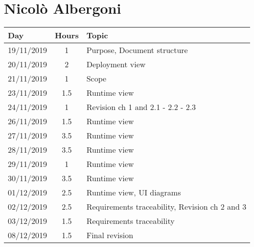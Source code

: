 \section{Nicolò Albergoni}
\begin{table}[H]
  \centering
  \begin{tabularx}{\textwidth}{ |l|c|X| }
      \hline
      Day & Hours & Topic \\
      \hline
      19/11/2019 & 1 & Purpose, Document structure \\								
      \hline
      20/11/2019 & 2 & Deployment view \\
      \hline
      21/11/2019 & 1 & Scope \\
      \hline								
      23/11/2019 & 1.5 &  Runtime view \\									
      \hline
      24/11/2019 & 1 & Revision ch 1 and 2.1 - 2.2 - 2.3 \\									
      \hline
      26/11/2019 & 1.5 & Runtime view \\									
      \hline
      27/11/2019 & 3.5 & Runtime view \\									
      \hline
      28/11/2019 & 3.5 & Runtime view \\
      \hline
      29/11/2019 & 1 & Runtime view \\									
      \hline
      30/11/2019 & 3.5 & Runtime view \\									
      \hline
      01/12/2019 & 2.5 & Runtime view, UI diagrams \\									
      \hline
      02/12/2019 & 2.5 & Requirements traceability, Revision ch 2 and 3\\									
      \hline
      03/12/2019 & 1.5 & Requirements traceability \\						
      \hline
      08/12/2019 & 1.5 & Final revision \\						
      \hline        							
  \end{tabularx}
\end{table}
